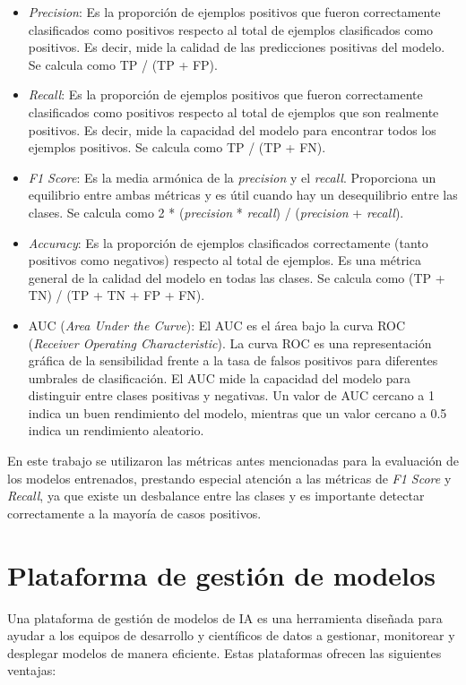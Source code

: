 \begin{itemize}
\item \textit{Precision}: Es la proporción de ejemplos positivos que fueron correctamente clasificados como positivos respecto al total de ejemplos clasificados como positivos. Es decir, mide la calidad de las predicciones positivas del modelo. Se calcula como TP / (TP + FP).
\item \textit{Recall}: Es la proporción de ejemplos positivos que fueron correctamente clasificados como positivos respecto al total de ejemplos que son realmente positivos. Es decir, mide la capacidad del modelo para encontrar todos los ejemplos positivos. Se calcula como TP / (TP + FN).
\item \textit{F1 Score}: Es la media armónica de la \textit{precision} y el \textit{recall}. Proporciona un equilibrio entre ambas métricas y es útil cuando hay un desequilibrio entre las clases. Se calcula como 2 * (\textit{precision} * \textit{recall}) / (\textit{precision} + \textit{recall}).
\item \textit{Accuracy}: Es la proporción de ejemplos clasificados correctamente (tanto positivos como negativos) respecto al total de ejemplos. Es una métrica general de la calidad del modelo en todas las clases. Se calcula como (TP + TN) / (TP + TN + FP + FN).
\item AUC (\textit{Area Under the Curve}): El AUC es el área bajo la curva ROC (\textit{Receiver Operating Characteristic}). La curva ROC es una representación gráfica de la sensibilidad frente a la tasa de falsos positivos para diferentes umbrales de clasificación. El AUC mide la capacidad del modelo para distinguir entre clases positivas y negativas. Un valor de AUC cercano a 1 indica un buen rendimiento del modelo, mientras que un valor cercano a 0.5 indica un rendimiento aleatorio.
\end{itemize}

En este trabajo se utilizaron las métricas antes mencionadas para la evaluación de los modelos entrenados, prestando especial atención a las métricas de \textit{F1 Score} y \textit{Recall}, ya que existe un desbalance entre las clases y es importante detectar correctamente a la mayoría de casos positivos.

\section{Plataforma de gestión de modelos}

Una plataforma de gestión de modelos de IA es una herramienta diseñada para ayudar a los equipos de desarrollo y científicos de datos a gestionar, monitorear y desplegar modelos de manera eficiente. Estas plataformas ofrecen las siguientes ventajas:

